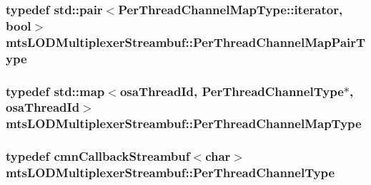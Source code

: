 \subsubsection[{Per\+Thread\+Channel\+Map\+Pair\+Type}]{\setlength{\rightskip}{0pt plus 5cm}typedef std\+::pair$<$Per\+Thread\+Channel\+Map\+Type\+::iterator, bool$>$ {\bf mts\+L\+O\+D\+Multiplexer\+Streambuf\+::\+Per\+Thread\+Channel\+Map\+Pair\+Type}\hspace{0.3cm}{\ttfamily [protected]}}\label{classmts_l_o_d_multiplexer_streambuf_aa6778f2331bcb1be3e4817612b97f42a}
\hypertarget{classmts_l_o_d_multiplexer_streambuf_aff1696a1ada12cd77decfe1deb5d8a63}{}
\subsubsection[{Per\+Thread\+Channel\+Map\+Type}]{\setlength{\rightskip}{0pt plus 5cm}typedef std\+::map$<${\bf osa\+Thread\+Id}, {\bf Per\+Thread\+Channel\+Type}$\ast$, {\bf osa\+Thread\+Id}$>$ {\bf mts\+L\+O\+D\+Multiplexer\+Streambuf\+::\+Per\+Thread\+Channel\+Map\+Type}\hspace{0.3cm}{\ttfamily [protected]}}\label{classmts_l_o_d_multiplexer_streambuf_aff1696a1ada12cd77decfe1deb5d8a63}
\hypertarget{classmts_l_o_d_multiplexer_streambuf_a945f4bdc4f4a79290018377ae3de68e9}{}
\subsubsection[{Per\+Thread\+Channel\+Type}]{\setlength{\rightskip}{0pt plus 5cm}typedef {\bf cmn\+Callback\+Streambuf}$<$char$>$ {\bf mts\+L\+O\+D\+Multiplexer\+Streambuf\+::\+Per\+Thread\+Channel\+Type}}\label{classmts_l_o_d_multiplexer_streambuf_a945f4bdc4f4a79290018377ae3de68e9}
\hypertarget{classmts_l_o_d_multiplexer_streambuf_aad2a9ad3c0067d2f8cde938845daa252}{}
